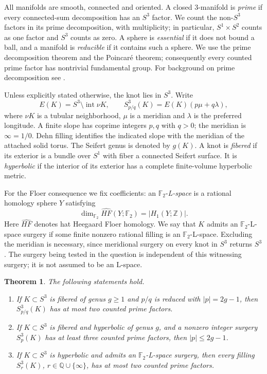 \documentclass[11pt]{article}
\newtheorem{theorem}{Theorem}[section]
\theoremstyle{remark}
\newcommand{\Z}{\mathbb Z}
\newcommand{\Q}{\mathbb Q}
\newcommand{\F}{\mathbb F_2}
\newcommand{\HF}{\widehat{HF}}
\begin{document}
All manifolds are smooth, connected and oriented. A closed $3$-manifold is \emph{prime} if every connected-sum decomposition has an $S^3$ factor. We count the non-$S^3$ factors in its prime decomposition, with multiplicity; in particular, $S^1\times S^2$ counts as one factor and $S^3$ counts as zero. A sphere is \emph{essential} if it does not bound a ball, and a manifold is \emph{reducible} if it contains such a sphere. We use the prime decomposition theorem and the Poincar\'e theorem; consequently every counted prime factor has nontrivial fundamental group. For background on prime decomposition see \cite[Section~1.1]{Hatcher}.

Unless explicitly stated otherwise, the knot lies in $S^3$. Write
\[
 E(K)=S^3\setminus\operatorname{int}\nu K,
 \qquad S^3_{p/q}(K)=E(K)(p\mu+q\lambda),
\]
where $\nu K$ is a tubular neighborhood, $\mu$ is a meridian and $\lambda$ is the preferred longitude. A finite slope has coprime integers $p,q$ with $q>0$; the meridian is $\infty=1/0$. Dehn filling identifies the indicated slope with the meridian of the attached solid torus. The Seifert genus is denoted by $g(K)$. A knot is \emph{fibered} if its exterior is a bundle over $S^1$ with fiber a connected Seifert surface. It is \emph{hyperbolic} if the interior of its exterior has a complete finite-volume hyperbolic metric.

For the Floer consequence we fix coefficients: an $\F$-\emph{L-space} is a rational homology sphere $Y$ satisfying
\[
 \dim_{\F}\HF(Y;\F)=|H_1(Y;\Z)|.
\]
Here $\HF$ denotes hat Heegaard Floer homology. We say that $K$ admits an $\F$-L-space surgery if some finite nonzero rational filling is an $\F$-L-space. Excluding the meridian is necessary, since meridional surgery on every knot in $S^3$ returns $S^3$. The surgery being tested in the question is independent of this witnessing surgery; it is not assumed to be an L-space.

\begin{theorem}\label{thm:main}
The following statements hold.
\begin{enumerate}
\item If $K\subset S^3$ is fibered of genus $g\geq1$ and $p/q$ is reduced with $|p|=2g-1$, then $S^3_{p/q}(K)$ has at most two counted prime factors.
\item If $K\subset S^3$ is fibered and hyperbolic of genus $g$, and a nonzero integer surgery $S^3_p(K)$ has at least three counted prime factors, then $|p|\leq2g-1$.
\item If $K\subset S^3$ is hyperbolic and admits an $\F$-L-space surgery, then every filling $S^3_r(K)$, $r\in\Q\cup\{\infty\}$, has at most two counted prime factors.
\end{enumerate}
\end{theorem}
\end{document}
